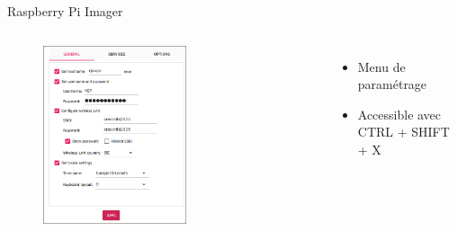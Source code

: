\documentclass[aspectratio=169,xcolor=dvipsnames]{beamer}
\begin{document}
\begin{frame}{Raspberry Pi Imager}
    \begin{columns}[c] %

        \begin{figure}
            \includegraphics[width=0.6\textwidth]{images/rpi-imager-1.png}
        \end{figure}

        \begin{itemize}
            \item Menu de paramétrage
            \item Accessible avec CTRL + SHIFT + X
        \end{itemize}

    \end{columns}
\end{frame}

\end{document}

